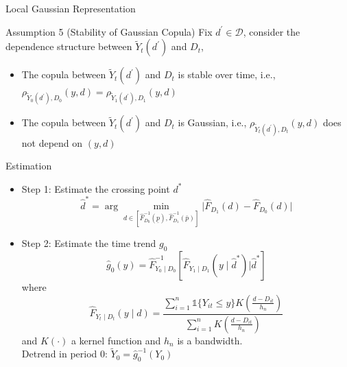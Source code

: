 \documentclass[aspectratio=1610, 9pt]{beamer}
\begin{document}
\begin{frame}{Local Gaussian Representation}

\vspace{0.4cm}

\begin{block}{Assumption 5 (Stability of Gaussian Copula)} Fix $d^\prime\in \mathcal{D}$, consider the dependence structure between $\tilde{Y}_t(d^\prime) $ and $D_t$,
 \vspace{0.1cm}

\begin{itemize}

\item[(i)] The copula between $\tilde{Y}_t(d^\prime) $ and $D_t$ is stable over time, i.e., $\rho_{\tilde{Y}_0(d^\prime),D_0}(y,d)=\rho_{\tilde{Y}_1(d^\prime),D_1}(y,d)$
\vspace{0.2cm}
    \item[(ii)] The copula between $\tilde{Y}_t(d^\prime) $ and $D_t$ is Gaussian,
    i.e., $\rho_{\tilde{Y}_t(d^\prime),D_t}(y,d)$ does not depend on $(y,d)$
    
\end{itemize}
     
\end{block}

\end{frame}


\begin{frame}{Estimation}

\begin{itemize}
    \item Step 1: Estimate the crossing point $d^*$\\
$$\widehat{d}^* = \arg \min_{d\in [\widehat{F}_{D_{0}}^{-1}(\underline{p}),\widehat{F}_{D_{1}}^{-1}(\bar{p}) ]} \Big| \widehat{F}_{D_{1}}(d)-\widehat{F}_{D_{0}}(d) \Big| $$
    \item Step 2: Estimate the time trend $g_0$
    $$\widehat{g}_{0}(y)=\widehat{F}_{Y_{0}\mid D_{0}}^{-1}\left[\widehat{F}_{Y_{1}\mid D_{1}}(y\mid \widehat{d}^*)\big|\widehat{d}^*\right]$$ where
    $$\widehat{F}_{Y_{t}\mid D_{t}}(y\mid d)=\frac{\sum_{i=1}^{n}\mathds{1}\{Y_{it}\leq y\}K\left(\frac{d-D_{it}}{h_{n}}\right)}{\sum_{i=1}^{n}K\left(\frac{d-D_{it}}{h_{n}}\right)}$$ and $K(\cdot)$ a kernel function and $h_n$ is a bandwidth.\\
\vspace{0.2cm}
    Detrend in period 0:  $\tilde{Y}_0 = \widehat{g}_0^{-1}(Y_0)$
\end{itemize}
    
\end{frame}
\end{document}
